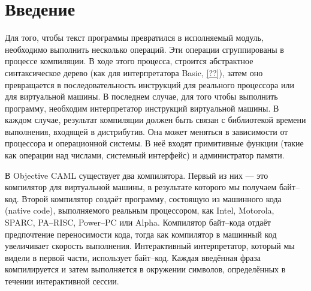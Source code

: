 \section {Введение}

Для того, чтобы текст программы превратился в исполняемый модуль, необходимо
выполнить несколько операций. Эти операции сгруппированы в процессе компиляции.
В ходе этого процесса, строится абстрактное синтаксическое дерево (как для
интерпретатора Basic, \ref{??}), затем оно превращается в последовательность
инструкций для реального процессора или для виртуальной машины. В последнем
случае, для того чтобы выполнить программу, необходим интерпретатор инструкций
виртуальной машины. В каждом случае, результат компиляции должен быть связан с
библиотекой времени выполнения, входящей в дистрибутив. Она может меняться в
зависимости от процессора и операционной системы. В неё входят примитивные
функции (такие как операции над числами, системный интерфейс) и администратор
памяти.

В Objective CAML существует два компилятора. Первый из них --- это компилятор
для виртуальной машины, в результате которого мы получаем байт–код. Второй
компилятор создаёт программу, состоящую из машинного кода (native code),
выполняемого реальным процессором, как Intel, Motorola, SPARC, PA--RISC,
Power--PC или Alpha. Компилятор байт--кода отдаёт предпочтение переносимости
кода, тогда как компилятор в машинный код увеличивает скорость выполнения.
Интерактивный интерпретатор, который мы видели в первой части, использует
байт--код. Каждая введённая фраза компилируется и затем выполняется в окружении
символов, определённых в течении интерактивной сессии.